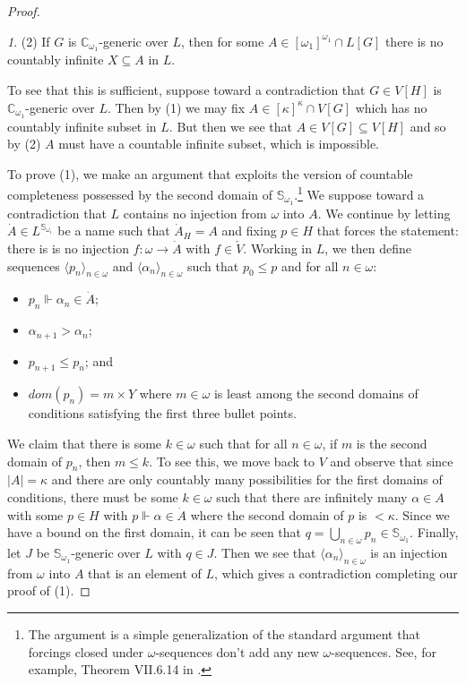\documentclass[10pt,a4paper]{amsart}
\numberwithin{equation}{section}
\numberwithin{figure}{section}
\theoremstyle{plain}
\theoremstyle{plain}
\theoremstyle{plain}
\theoremstyle{plain}
\theoremstyle{remark}
\newtheorem*{claim*}{\protect\claimname}
\theoremstyle{plain}
\theoremstyle{definition}
\providecommand{\claimname}{Claim}
\begin{document}
\begin{proof}
\begin{claim*}
(2) If $G$ is $\mathbb{C}_{\omega_{1}}$-generic over $L$, then
for some $A\in[\omega_{1}]^{\omega_{1}}\cap L[G]$ there is no countably
infinite $X\subseteq A$ in $L$. 
\end{claim*}
To see that this is sufficient, suppose toward a contradiction that
$G\in V[H]$ is $\mathbb{C}_{\omega_{1}}$-generic over $L$. Then
by (1) we may fix $A\in[\kappa]^{\kappa}\cap V[G]$ which has no countably
infinite subset in $L$. But then we see that $A\in V[G]\subseteq V[H]$
and so by (2) $A$ must have a countable infinite subset, which is
impossible. 

To prove (1), we make an argument that exploits the version of countable
completeness possessed by the second domain of $\mathbb{S}_{\omega_{1}}$.\footnote{The argument is a simple generalization of the standard argument that
forcings closed under $\omega$-sequences don't add any new $\omega$-sequences.
See, for example, Theorem VII.6.14 in \citep{KunenST}.} We suppose toward a contradiction that $L$ contains no injection
from $\omega$ into $A$. We continue by letting $\dot{A}\in L^{\mathbb{S}_{\omega_{1}}}$
be a name such that $\dot{A}_{H}=A$ and fixing $p\in H$ that forces
the statement: there is is no injection $f:\omega\to\dot{A}$ with
$f\in\check{V}$. Working in $L$, we then define sequences $\langle p_{n}\rangle_{n\in\omega}$
and $\langle\alpha_{n}\rangle_{n\in\omega}$ such that $p_{0}\leq p$
and for all $n\in\omega$:
\begin{itemize}
\item $p_{n}\Vdash\alpha_{n}\in\dot{A}$;
\item $\alpha_{n+1}>\alpha_{n}$; 
\item $p_{n+1}\leq p_{n}$; and 
\item $dom(p_{n})=m\times Y$ where $m\in\omega$ is least among the second
domains of conditions satisfying the first three bullet points.
\end{itemize}
We claim that there is some $k\in\omega$ such that for all $n\in\omega$,
if $m$ is the second domain of $p_{n}$, then $m\leq k$. To see
this, we move back to $V$ and observe that since $|A|=\kappa$ and
there are only countably many possibilities for the first domains
of conditions, there must be some $k\in\omega$ such that there are
infinitely many $\alpha\in A$ with some $p\in H$ with $p\Vdash\alpha\in\dot{A}$
where the second domain of $p$ is $<\kappa$. Since we have a bound
on the first domain, it can be seen that $q=\bigcup_{n\in\omega}p_{n}\in\mathbb{S}_{\omega_{1}}$.
Finally, let $J$ be $\mathbb{S}_{\omega_{1}}$-generic over $L$
with $q\in J$. Then we see that $\langle\alpha_{n}\rangle_{n\in\omega}$
is an injection from $\omega$ into $A$ that is an element of $L$,
which gives a contradiction completing our proof of (1).


\end{proof}
\end{document}
